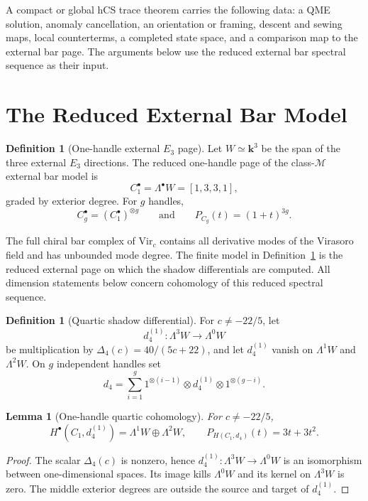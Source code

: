 \documentclass[11pt]{article}
\theoremstyle{plain}
\newtheorem{lemma}[theorem]{Lemma}
\theoremstyle{definition}
\newtheorem{definition}[theorem]{Definition}
\theoremstyle{remark}
\newcommand{\kk}{\mathbf{k}}
\newcommand{\Vir}{\mathrm{Vir}}
\begin{document}
A compact or global hCS trace theorem carries the following data: a QME
solution, anomaly cancellation, an orientation or framing, descent and sewing
maps, local counterterms, a completed state space, and a comparison map to the
external bar page. The arguments below use the reduced external bar spectral
sequence as their input.

\section{The Reduced External Bar Model}
\label{sec:reduced-model}

\begin{definition}[One-handle external $E_3$ page]
\label{def:one-handle-page}
Let $W\simeq\kk^3$ be the span of the three external $E_3$ directions. The
reduced one-handle page of the class-$\mathcal{M}$ external bar model is
\[
 C_1^\bullet=\Lambda^\bullet W=[1,3,3,1],
\]
graded by exterior degree. For $g$ handles,
\[
 C_g^\bullet=(C_1^\bullet)^{\otimes g}
 \qquad\text{and}\qquad
 P_{C_g}(t)=(1+t)^{3g}.
\]
\end{definition}

The full chiral bar complex of $\Vir_c$ contains all derivative modes of the
Virasoro field and has unbounded mode degree. The finite model in
Definition~\ref{def:one-handle-page} is the reduced external page on which
the shadow differentials are computed. All dimension statements below concern
cohomology of this reduced spectral sequence.

\begin{definition}[Quartic shadow differential]
\label{def:quartic-differential}
For $c\neq -22/5$, let
\[
 d_4^{(1)}:\Lambda^3 W\longrightarrow \Lambda^0 W
\]
be multiplication by $\Delta_4(c)=40/(5c+22)$, and let $d_4^{(1)}$ vanish
on $\Lambda^1W$ and $\Lambda^2W$. On $g$ independent handles set
\[
 d_4=\sum_{i=1}^g
 1^{\otimes(i-1)}\otimes d_4^{(1)}\otimes 1^{\otimes(g-i)}.
\]
\end{definition}

\begin{lemma}[One-handle quartic cohomology]
\label{lem:one-handle}
For $c\neq -22/5$,
\[
 H^\bullet(C_1,d_4^{(1)})=\Lambda^1W\oplus\Lambda^2W,
 \qquad
 P_{H(C_1,d_4)}(t)=3t+3t^2.
\]
\end{lemma}

\begin{proof}
The scalar $\Delta_4(c)$ is nonzero, hence
$d_4^{(1)}:\Lambda^3W\to\Lambda^0W$ is an isomorphism between
one-dimensional spaces. Its image kills $\Lambda^0W$ and its kernel on
$\Lambda^3W$ is zero. The middle exterior degrees are outside the source
and target of $d_4^{(1)}$.
\end{proof}
\end{document}
